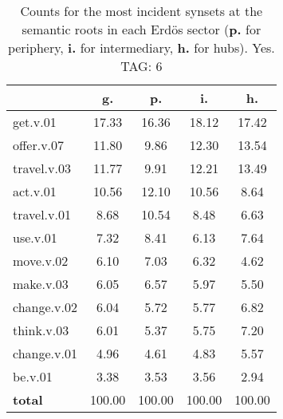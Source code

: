 \begin{table}[h!]
\begin{center}
\begin{tabular}{| l || c | c | c | c |}\hline
 & {\bf g.} & {\bf p.} & {\bf i.} & {\bf h.} \\\hline\hline
get.v.01 & 17.33  & 16.36  & 18.12  & 17.42 \\\hline
offer.v.07 & 11.80  & 9.86  & 12.30  & 13.54 \\\hline
travel.v.03 & 11.77  & 9.91  & 12.21  & 13.49 \\\hline
act.v.01 & 10.56  & 12.10  & 10.56  & 8.64 \\\hline
travel.v.01 & 8.68  & 10.54  & 8.48  & 6.63 \\\hline
use.v.01 & 7.32  & 8.41  & 6.13  & 7.64 \\\hline
move.v.02 & 6.10  & 7.03  & 6.32  & 4.62 \\\hline
make.v.03 & 6.05  & 6.57  & 5.97  & 5.50 \\\hline
change.v.02 & 6.04  & 5.72  & 5.77  & 6.82 \\\hline
think.v.03 & 6.01  & 5.37  & 5.75  & 7.20 \\\hline
change.v.01 & 4.96  & 4.61  & 4.83  & 5.57 \\\hline
be.v.01 & 3.38  & 3.53  & 3.56  & 2.94 \\\hline\hline
{{\bf total}} & 100.00  & 100.00  & 100.00  & 100.00 \\\hline
\end{tabular}
\caption{Counts for the most incident synsets at the semantic roots in each Erd\"os sector ({\bf p.} for periphery, {\bf i.} for intermediary, {\bf h.} for hubs). Yes. TAG: 6}
\end{center}
\end{table}